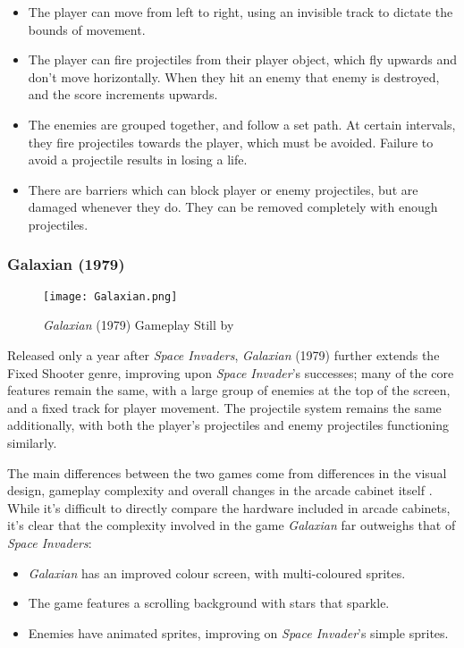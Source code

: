 \documentclass{scrartcl}
\let\cite\textcite
\let\citep\autocite
\begin{document}
\begin{itemize}
  \item The player can move from left to right, using an invisible track to dictate the bounds of movement.
  \item The player can fire projectiles from their player object, which fly upwards and don't move horizontally. When they hit an enemy that enemy is destroyed, and the score increments upwards.
  \item The enemies are grouped together, and follow a set path. At certain intervals, they fire projectiles towards the player, which must be avoided. Failure to avoid a projectile results in losing a life.
  \item There are barriers which can block player or enemy projectiles, but are damaged whenever they do. They can be removed completely with enough projectiles.
\end{itemize}

\subsubsection{Galaxian (1979)}

\begin{figure}[ht]
  \centering
  \texttt{[image: Galaxian.png]}
  \caption[\textit{Galaxian}]{\textit{Galaxian} (1979) Gameplay Still by \cite{Wikimedia001}}
\end{figure}


Released only a year after \textit{Space Invaders}, \textit{Galaxian} (1979) further extends the Fixed Shooter genre, improving upon \textit{Space Invader}'s successes; many of the core features remain the same, with a large group of enemies at the top of the screen, and a fixed track for player movement. The projectile system remains the same additionally, with both the player's projectiles and enemy projectiles functioning similarly.

The main differences between the two games come from differences in the visual design, gameplay complexity and overall changes in the arcade cabinet itself \citep{Youtube002}. While it's difficult to directly compare the hardware included in arcade cabinets, it's clear that the complexity involved in the game \textit{Galaxian} far outweighs that of \textit{Space Invaders}:

\begin{itemize}
  \item \textit{Galaxian} has an improved colour screen, with multi-coloured sprites.
  \item The game features a scrolling background with stars that sparkle.
  \item Enemies have animated sprites, improving on \textit{Space Invader}'s simple sprites.
\end{itemize}
\end{document}
